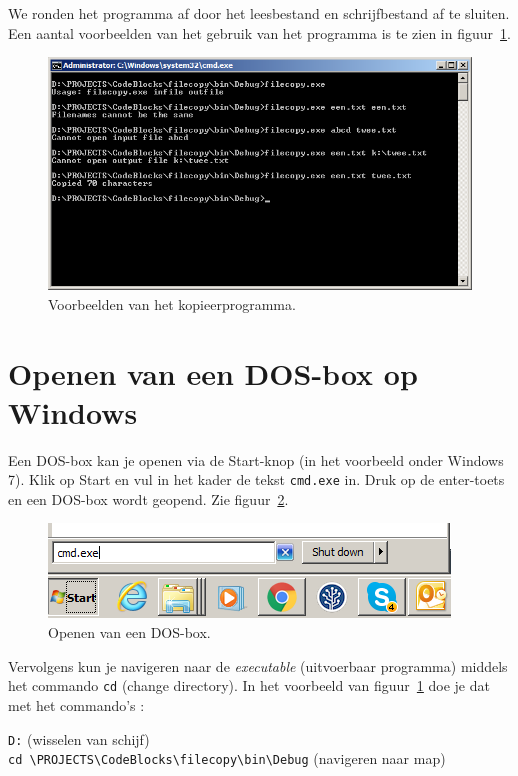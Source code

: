 \documentclass[a4paper,12pt,twoside]{article}
\begin{document}
We ronden het programma af door het leesbestand en schrijfbestand af te sluiten. Een
aantal voorbeelden van het gebruik van het programma is te zien in figuur~\ref{fig:filecopy}.

\begin{figure}[!ht]
\centering
\includegraphics[width=\textwidth]{filecopy.png}
\caption{Voorbeelden van het kopieerprogramma.}
\label{fig:filecopy}
\end{figure}

\section{Openen van een DOS-box op Windows}
Een DOS-box kan je openen via de Start-knop (in het voorbeeld onder Windows 7).
Klik op Start en vul in het kader de tekst \lstinline|cmd.exe| in. Druk op de
enter-toets en een DOS-box wordt geopend. Zie figuur~\ref{fig:cmdexe}.

\begin{figure}[!ht]
\centering
\includegraphics[scale=0.63]{cmdexe.png}
\caption{Openen van een DOS-box.}
\label{fig:cmdexe}
\end{figure}

Vervolgens kun je navigeren naar de \textsl{executable} (uitvoerbaar programma)
middels het commando \lstinline|cd| (change directory). In het voorbeeld van
figuur~\ref{fig:filecopy} doe je dat met het commando's :

\lstinline|D:| (wisselen van schijf) \\
\lstinline|cd \PROJECTS\CodeBlocks\filecopy\bin\Debug| (navigeren naar map)
\end{document}
